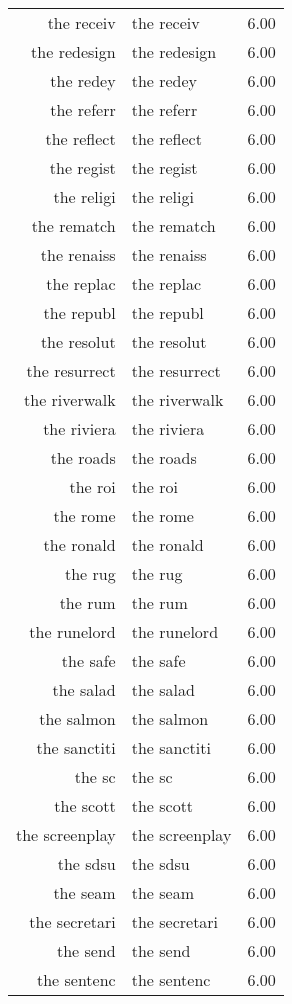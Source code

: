 \begin{table}[ht]
\begin{tabular}{rlr}
  the receiv & the receiv & 6.00 \\ 
  the redesign & the redesign & 6.00 \\ 
  the redey & the redey & 6.00 \\ 
  the referr & the referr & 6.00 \\ 
  the reflect & the reflect & 6.00 \\ 
  the regist & the regist & 6.00 \\ 
  the religi & the religi & 6.00 \\ 
  the rematch & the rematch & 6.00 \\ 
  the renaiss & the renaiss & 6.00 \\ 
  the replac & the replac & 6.00 \\ 
  the republ & the republ & 6.00 \\ 
  the resolut & the resolut & 6.00 \\ 
  the resurrect & the resurrect & 6.00 \\ 
  the riverwalk & the riverwalk & 6.00 \\ 
  the riviera & the riviera & 6.00 \\ 
  the roads & the roads & 6.00 \\ 
  the roi & the roi & 6.00 \\ 
  the rome & the rome & 6.00 \\ 
  the ronald & the ronald & 6.00 \\ 
  the rug & the rug & 6.00 \\ 
  the rum & the rum & 6.00 \\ 
  the runelord & the runelord & 6.00 \\ 
  the safe & the safe & 6.00 \\ 
  the salad & the salad & 6.00 \\ 
  the salmon & the salmon & 6.00 \\ 
  the sanctiti & the sanctiti & 6.00 \\ 
  the sc & the sc & 6.00 \\ 
  the scott & the scott & 6.00 \\ 
  the screenplay & the screenplay & 6.00 \\ 
  the sdsu & the sdsu & 6.00 \\ 
  the seam & the seam & 6.00 \\ 
  the secretari & the secretari & 6.00 \\ 
  the send & the send & 6.00 \\ 
  the sentenc & the sentenc & 6.00 \\ 

\end{tabular}
\end{table}
